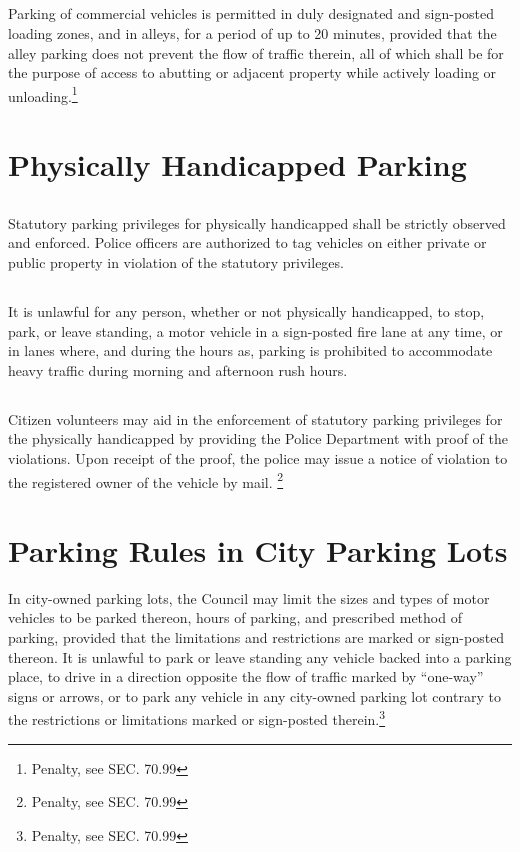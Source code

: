 \subsection{}
Parking of commercial vehicles is permitted in duly designated and sign-posted loading zones, and in alleys, for a period of up to 20 minutes, provided that the alley parking does not prevent the flow of traffic therein, all of which shall be for the purpose of access to abutting or adjacent property while actively loading or unloading.\footnote{Penalty, see SEC. 70.99}

\section{Physically Handicapped Parking}
\subsection{}
Statutory parking privileges for physically handicapped shall be strictly observed and enforced.  Police officers are authorized to tag vehicles on either private or public property in violation of the statutory privileges.
\subsection{}
It is unlawful for any person, whether or not physically handicapped, to stop, park, or leave standing, a motor vehicle in a sign-posted fire lane at any time, or in lanes where, and during the hours as, parking is prohibited to accommodate heavy traffic during morning and afternoon rush hours.
\subsection{}
Citizen volunteers may aid in the enforcement of statutory parking privileges for the physically handicapped by providing the Police Department with proof of the violations.  Upon receipt of the proof, the police may issue a notice of violation to the registered owner of the vehicle by mail. \footnote{Penalty, see SEC. 70.99}

\section{Parking Rules in City Parking Lots}
In city-owned parking lots, the Council may limit the sizes and types of motor vehicles to be parked thereon, hours of parking, and prescribed method of parking, provided that the limitations and restrictions are marked or sign-posted thereon.  It is unlawful to park or leave standing any vehicle backed into a parking place, to drive in a direction opposite the flow of traffic marked by “one-way” signs or arrows, or to park any vehicle in any city-owned parking lot contrary to the restrictions or limitations marked or sign-posted therein.\footnote{Penalty, see SEC. 70.99}

